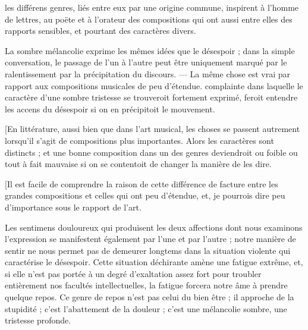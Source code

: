 \documentclass[11pt,a4paper]{article}
\begin{document}
les différens genres, liés entre eux par une origine commune, inspirent à
l'homme de lettres, au poëte et à l'orateur des compositions qui
 ont aussi entre elles des rapports sensibles, et
pourtant des caractères divers.

La sombre mélancolie exprime les mêmes idées que le désespoir ; dans la
simple conversation,  le passage de l'un à l'autre peut
être uniquement marqué par le ralentissement  par la
précipitation du discours. — La même chose est vrai par rapport aux
compositions musicales de peu d'étendue.  complainte
  dans laquelle le caractère d'une sombre
tristesse se trouveroit fortement exprimé, feroit entendre les accens du
désespoir si on en précipitoit le mouvement.

[En littérature, aussi bien que dans l'art musical, les choses se passent
autrement lorsqu'il s'agit de compositions plus importantes. Alors les
caractères sont distincts ; et une bonne composition dans un des genres
 deviendroit ou foible ou tout à fait mauvaise si on se
contentoit de changer la manière de les dire.

[Il est facile de comprendre la raison de cette différence de facture
entre les grandes compositions et celles qui ont peu d'étendue, et, je
pourrois dire peu d'importance sous le rapport de l'art.

Les sentimens douloureux qui produisent les deux affections dont nous
examinons l'expression  se manifestent
également par l'une et par l'autre ;  notre
manière de sentir ne nous permet pas de demeurer longtems dans la
situation violente qui caractérise le désespoir. Cette situation
déchirante amène une fatigue extrême, et, si elle n'est  pas
portée à un  degré d'exaltation assez fort pour troubler
entièrement nos facultés intellectuelles, la fatigue  forcera
notre âme à prendre quelque repos. Ce genre de repos n'est pas celui du
bien être ; il approche de la stupidité ; c'est l'abattement de la
douleur ; c'est une mélancolie sombre, 
une tristesse profonde.
\end{document}
